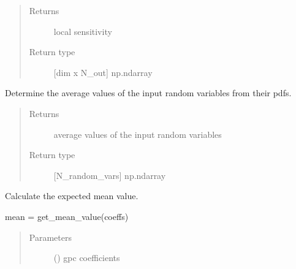 \documentclass[letterpaper,10pt,english,openany,oneside]{sphinxmanual}
\begin{document}
\begin{fulllineitems}
\begin{fulllineitems}
\begin{quote}
\begin{description}
\begin{itemize}
\end{itemize}

\item[{Returns}] \leavevmode
{} \textendash{} local sensitivity

\item[{Return type}] \leavevmode
{[}dim x N\_out{]} np.ndarray

\end{description}\end{quote}

\end{fulllineitems}


\begin{fulllineitems}
\label{\detokenize{pygpc:pygpc.gpc.gPC.get_mean_random_vars_input}}
Determine the average values of the input random variables from their pdfs.
\begin{quote}\begin{description}
\item[{Returns}] \leavevmode
{} \textendash{} average values of the input random variables

\item[{Return type}] \leavevmode
{[}N\_random\_vars{]} np.ndarray

\end{description}\end{quote}

\end{fulllineitems}


\begin{fulllineitems}
\label{\detokenize{pygpc:pygpc.gpc.gPC.get_mean}}
Calculate the expected mean value.

mean = get\_mean\_value(coeffs)
\begin{quote}\begin{description}
\item[{Parameters}] \leavevmode
{} (\sphinxstyleliteralemphasis{\sphinxupquote{{[}}}\sphinxstyleliteralemphasis{\sphinxupquote{{]} }}) \textendash{} gpc coefficients


\end{description}
\end{quote}
\end{fulllineitems}
\end{fulllineitems}
\end{document}
